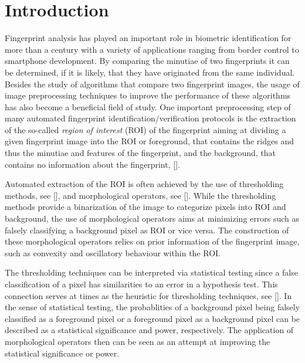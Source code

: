\documentclass[a4paper,12pt]{article}
\theoremstyle{plain}
\theoremstyle{definition}
\begin{document}
\newpage

\section{Introduction}\label{sectionintroduction}

Fingerprint analysis has played an important role in biometric identification for more than a century with a variety of applications ranging from border control to smartphone development. By comparing the minutiae of two fingerprints it can be determined, if it is likely, that they have originated from the same individual. Besides the study of algorithms that compare two fingerprint images, the usage of image preprocessing techniques to improve the performance of these algorithms has also become a beneficial field of study. One important preprocessing step of many automated fingerprint identification/verification protocols is the extraction of the so-called \emph{region of interest} (ROI) of the fingerprint aiming at dividing a given fingerprint image into the ROI or foreground, that contains the ridges and thus the minutiae and features of the fingerprint, and the background, that contains no information about the fingerprint, [].

Automated extraction of the ROI is often achieved by the use of thresholding methods, see [], and morphological operators, see []. While the thresholding methods provide a binarization of the image to categorize pixels into ROI and background, the use of morphological operators aims at minimizing errors such as falsely classifying a background pixel as ROI or vice versa. The construction of these morphological operators relies on prior information of the fingerprint image, such as convexity and oscillatory behaviour within the ROI.

The thresholding techniques can be interpreted via statistical testing since a false classification of a pixel has similarities to an error in a hypothesis test. This connection serves at times as the heuristic for thresholding techniques, see []. In the sense of statistical testing, the probablities of a background pixel being falsely classified as a foreground pixel or a foreground pixel as a background pixel can be described as a statistical significance and power, respectively. The application of morphological operators then can be seen as an attempt at improving the statistical significance or power.
\end{document}
